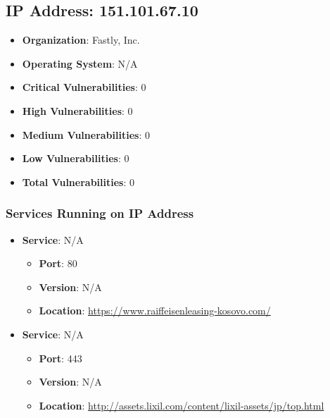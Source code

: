 \documentclass{article}
\begin{document}
\clearpage



\subsection*{IP Address: 151.101.67.10}

\begin{itemize}
    \item \textbf{Organization}: Fastly, Inc.
    \item \textbf{Operating System}:  N/A 
    \item \textbf{Critical Vulnerabilities}: 0
    \item \textbf{High Vulnerabilities}: 0
    \item \textbf{Medium Vulnerabilities}: 0
    \item \textbf{Low Vulnerabilities}: 0
    \item \textbf{Total Vulnerabilities}: 0
\end{itemize}

\subsubsection*{Services Running on IP Address}

\begin{itemize}
    
        \item \textbf{Service}: N/A
        \begin{itemize}
            \item \textbf{Port}: 80
            \item \textbf{Version}:  N/A 
            \item \textbf{Location}: \href{ https://www.raiffeisenleasing-kosovo.com/ }{ https://www.raiffeisenleasing-kosovo.com/ }
        \end{itemize}
    
        \item \textbf{Service}: N/A
        \begin{itemize}
            \item \textbf{Port}: 443
            \item \textbf{Version}:  N/A 
            \item \textbf{Location}: \href{ http://assets.lixil.com/content/lixil-assets/jp/top.html }{ http://assets.lixil.com/content/lixil-assets/jp/top.html }
        \end{itemize}
    
\end{itemize}
\end{document}
